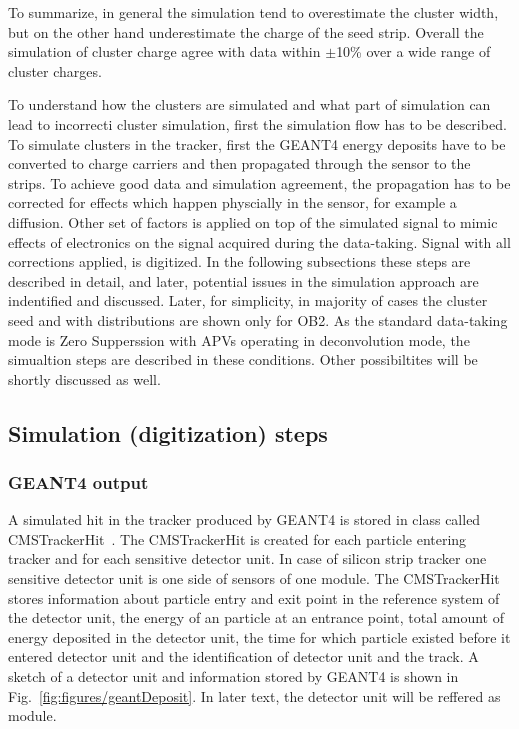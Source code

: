 To summarize, in general the simulation tend to overestimate the cluster width, but on the other hand underestimate the charge of the seed strip. Overall the simulation of cluster charge agree with data within $\pm$10\% over a wide range of cluster charges.  

To understand how the clusters are simulated and what part of simulation can lead to incorrecti cluster simulation, first the simulation flow has to be described. To simulate clusters in the tracker, first the GEANT4 energy deposits have to be converted to charge carriers and then propagated through the sensor to the strips. To achieve good data and simulation agreement, the propagation has to be corrected for effects which happen physcially in the sensor, for example a diffusion. Other set of factors is applied on top of the simulated signal to mimic effects of electronics on the signal acquired during the data-taking. Signal with all corrections applied, is digitized. In the following subsections these steps are described in detail, and later, potential issues in the simulation approach are indentified and discussed. Later, for simplicity, in majority of cases the cluster seed and with distributions are shown only for OB2. As the standard data-taking mode is Zero Supperssion with APVs operating in deconvolution mode, the simualtion steps are described in these conditions. Other possibiltites will be shortly discussed as well.


\subsection{Simulation (digitization) steps}

\subsubsection{GEANT4 output}

A simulated hit in the tracker produced by GEANT4 is stored in class called CMSTrackerHit~\cite{Lefebure:1364020}. The CMSTrackerHit is created for each particle entering tracker and for each sensitive detector unit. In case of silicon strip tracker one sensitive detector unit is one side of sensors of one module. The CMSTrackerHit stores information about particle entry and exit point in the reference system of the detector unit, the energy of an particle at an entrance point, total amount of energy deposited in the detector unit, the time for which particle existed before it entered detector unit and the identification of detector unit and the track. A sketch of a detector unit and information stored by GEANT4 is shown in Fig.~\ref{fig:figures/geantDeposit}. In later text, the detector unit will be reffered as module.

